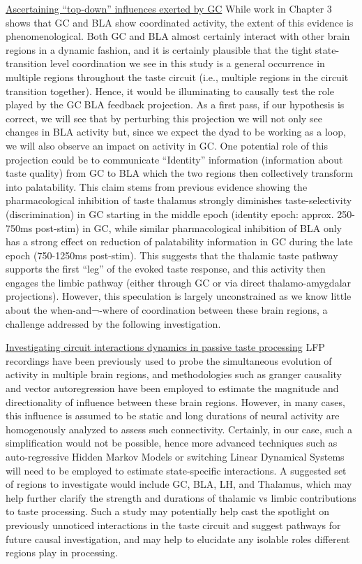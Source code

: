 \begin{refsection}
\smallskip
\noindent \underline{Ascertaining “top-down” influences exerted by GC} While work in Chapter 3 shows that GC and BLA show coordinated activity, the extent of this evidence is phenomenological. Both GC and BLA almost certainly interact with other brain regions in a dynamic fashion, and it is certainly plausible that the tight state-transition level coordination we see in this study is a general occurrence in multiple regions throughout the taste circuit (i.e., multiple regions in the circuit transition together). Hence, it would be illuminating to causally test the role played by the GCBLA feedback projection. As a first pass, if our hypothesis is correct, we will see that by perturbing this projection we will not only see changes in BLA activity but, since we expect the dyad to be working as a loop, we will also observe an impact on activity in GC. One potential role of this projection could be to communicate “Identity” information (information about taste quality) from GC to BLA which the two regions then collectively transform into palatability. This claim stems from previous evidence showing the pharmacological inhibition of taste thalamus strongly diminishes taste-selectivity (discrimination) in GC starting in the middle epoch (identity epoch: approx. 250-750ms post-stim) in GC, while similar pharmacological inhibition of BLA only has a strong effect on reduction of palatability information in GC during the late epoch (750-1250ms post-stim). This suggests that the thalamic taste pathway supports the first “leg” of the evoked taste response, and this activity then engages the limbic pathway (either through GC or via direct thalamo-amygdalar projections). However, this speculation is largely unconstrained as we know little about the when-and¬-where of coordination between these brain regions, a challenge addressed by the following investigation.

\smallskip
\noindent \underline{Investigating circuit interactions dynamics in passive taste processing} LFP recordings have been previously used to probe the simultaneous evolution of activity in multiple brain regions, and methodologies such as granger causality and vector autoregression have been employed to estimate the magnitude and directionality of influence between these brain regions. However, in many cases, this influence is assumed to be static and long durations of neural activity are homogenously analyzed to assess such connectivity. Certainly, in our case, such a simplification would not be possible, hence more advanced techniques such as auto-regressive Hidden Markov Models or switching Linear Dynamical Systems will need to be employed to estimate state-specific interactions. A suggested set of regions to investigate would include GC, BLA, LH, and Thalamus, which may help further clarify the strength and durations of thalamic vs limbic contributions to taste processing. Such a study may potentially help cast the spotlight on previously unnoticed interactions in the taste circuit and suggest pathways for future causal investigation, and may help to elucidate any isolable roles different regions play in processing.


\end{refsection}
